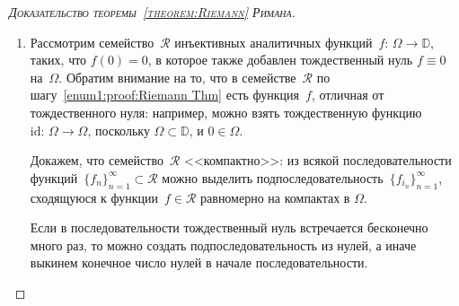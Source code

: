 \documentclass[../complex-analysis.tex]{subfiles}
\begin{document}
\begin{proof}[\normalfont\textsc{Доказательство теоремы~\ref{theorem:Riemann} Римана}]
\begin{enumerate}
   Покажем, что существует точка~$ a \in \CC \setminus \Omega_1 $, отделённая от $ \Omega_1 $. Заметим, что
   \begin{align}
    \label{eq:Omega1 not intersects with Omega1 + 2pi i:Riemann Thm}
    \Omega_1 \cap (\Omega_1 + 2\pi i) = \varnothing.
   \end{align}
   Действительно, если вдруг $ h(z_1) = h(z_2) + 2\pi i $, то
   \begin{align*}
    e^{h(z_1)} = e^{h(z_2) + 2\pi i} = e^{h(z_2)} \implies z_1 = z_2 \implies h(z_1) = h(z_1) + 2 \pi i,
   \end{align*} а это противоречие. Покажем, что в таком случае любая точка~$ a \in \Omega_1 + 2\pi i $ отделена от $ \Omega_1 $. Действительно, так как $ \Omega_1 + 2\pi i $ --- открытое множество, то точка~$ a $ входит в него вместе со своей окрестностью; эта же окрестность не пересекается с $ \Omega_1 $ по~\eqref{eq:Omega1 not intersects with Omega1 + 2pi i:Riemann Thm}.

   Далее мы будем полагать $ \Omega \subset \mathbb D $ и $ 0 \in \Omega $.

  \item \label{enum2:proof:Riemann Thm} Рассмотрим семейство~$ \mathcal R $ инъективных аналитичных функций~$ f\colon\,\Omega \to \mathbb D $, таких, что $ f(0) = 0 $, в которое также добавлен тождественный нуль $ f \equiv 0 $ на~$ \Omega $. Обратим внимание на то, что в семействе~$ \mathcal R $ по шагу~\ref{enum1:proof:Riemann Thm} есть функция~$ f $, отличная от тождественного нуля: например, можно взять тождественную функцию~$ \mathrm{id}\colon\,\Omega \to \Omega $, поскольку $ \Omega \subset \mathbb D $, и $ 0 \in \Omega $.

   Докажем, что семейство~$ \mathcal R $  <<компактно>>: из всякой последовательности функций~$ \{f_{n}\}_{n=1}^{\infty} \subset \mathcal R $ можно выделить подпоследовательность~$ \{f_{i_n}\}_{n=1}^{\infty}  $, сходящуюся к функции~$ f \in \mathcal R $ равномерно на компактах в $ \Omega $.

   Если в последовательности тождественный нуль встречается бесконечно много раз, то можно создать подпоследовательность из нулей, а иначе выкинем конечное число нулей в начале последовательности.


\end{enumerate}
\end{proof}
\end{document}
